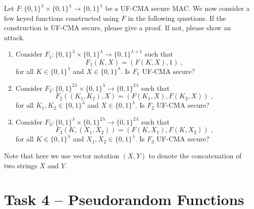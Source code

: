 \documentclass[11pt]{article}
\newcommand{\bits}{\{0,1\}}
\theoremstyle{plain}
\theoremstyle{definition}
\begin{document}
 \noindent Let $F: \bits^\lambda \times \bits^\lambda \to \bits^\lambda$ be a
 UF-CMA secure MAC. We now consider a few keyed functions constructed using $F$ in the following questions. If the construction is UF-CMA secure, please give a proof. If not, please show an attack.
 \begin{enumerate}
 \item Consider $F_1: \bits^\lambda \times
   \bits^{\lambda} \to \bits^{\lambda + 1}$ such that
   \begin{displaymath}
     F_1(K, X) = (F(K, X) , 1) \;,
   \end{displaymath}
   for all $K \in \bits^{\lambda}$ and $X \in \bits^\lambda$. Is $F_1$ UF-CMA secure?
 \item Consider $F_2: \bits^{2\lambda} \times
   \bits^{\lambda} \to \bits^{2\lambda}$ such that
   \begin{displaymath}
     F_2((K_1,K_2), X) = (F(K_1, X), F(K_2, X))\;,
   \end{displaymath}
   for all $K_1,K_2 \in \bits^\lambda$ and $X \in \bits^\lambda$. Is $F_2$ UF-CMA secure?
  \item Consider $F_3: \bits^\lambda \times
   \bits^{2\lambda} \to \bits^{2\lambda}$ such that
   \begin{displaymath}
     F_3(K, (X_1, X_2)) = (F(K, X_1), F(K, X_2)) \;,
   \end{displaymath}
   for all $K \in \bits^\lambda$ and $X_1, X_2 \in \bits^\lambda$. Is $F_3$ UF-CMA secure?
 \end{enumerate}
Note that here we use vector notation $(X,Y)$ to denote the
concatenation of two strings $X$ and $Y$.

\newpage

\section*{Task 4 -- Pseudorandom Functions}
\end{document}
